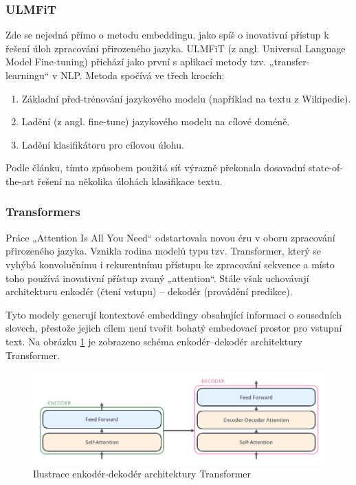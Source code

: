 \documentclass[thesis=M,czech]{FITthesis}[2019/12/23]
\begin{document}
\subsubsection{ULMFiT}
Zde se nejedná přímo o metodu embeddingu, jako spíš o inovativní přístup k řešení úloh zpracování přirozeného jazyka. ULMFiT (z angl. Universal Language Model Fine-tuning)\cite{hovard2018} přichází jako první s aplikací metody tzv. „transfer-learningu“ v NLP. Metoda spočívá ve třech krocích:
\begin{enumerate}
    \item Základní před-trénování jazykového modelu (například na textu z Wikipedie).
    \item Ladění (z angl. fine-tune) jazykového modelu na cílové doméně.
    \item Ladění klasifikátoru pro cílovou úlohu.
\end{enumerate}
Podle článku\cite{ghelani2019}, tímto způsobem použitá síť výrazně překonala dosavadní state-of-the-art řešení na několika úlohách klasifikace textu.

\subsubsection{Transformers}
Práce „Attention Is All You Need“\cite{vaswani2017} odstartovala novou éru v oboru zpracování přirozeného jazyka. Vznikla rodina modelů typu tzv. Transformer, který se vyhýbá konvolučnímu i rekurentnímu přístupu ke zpracování sekvence a místo toho používá inovativní přístup zvaný „attention“. Stále však uchovávají architekturu enkodér (čtení vstupu) -- dekodér (provádění predikce).

Tyto modely generují kontextové embeddingy obsahující informaci o sousedních slovech, přestože jejich cílem není tvořit bohatý embedovací prostor pro vstupní text.
 Na obrázku \ref{fig:alammar2018transformer} je zobrazeno schéma enkodér--dekodér architektury Transformer.
\begin{figure}\centering
	\includegraphics[width=\textwidth]{images/alammar2018_transformer.png}
	\caption{Ilustrace enkodér-dekodér architektury Transformer\cite{palachy2019}}\label{fig:alammar2018transformer}
\end{figure}
\end{document}
